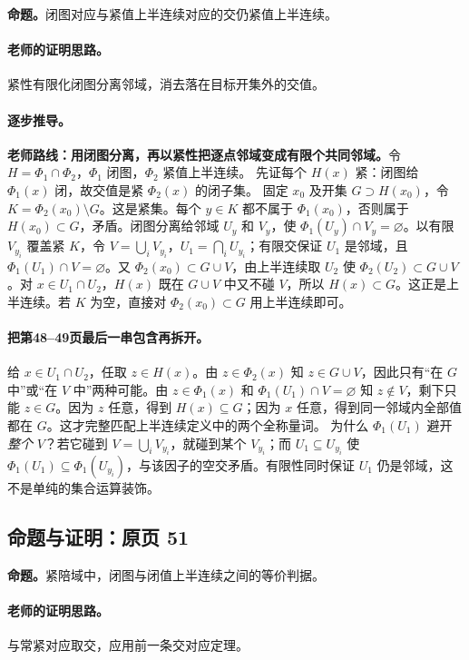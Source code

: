 \documentclass[11pt,a4paper]{article}
\theoremstyle{definition}\newtheorem{definition}{定义}\newtheorem{example}{例}
\begin{document}
\textbf{命题。}闭图对应与紧值上半连续对应的交仍紧值上半连续。

\paragraph{老师的证明思路。}紧性有限化闭图分离邻域，消去落在目标开集外的交值。

\paragraph{逐步推导。}\textbf{老师路线：用闭图分离，再以紧性把逐点邻域变成有限个共同邻域。}令 $H=\Phi_1\cap\Phi_2$，$\Phi_1$ 闭图，$\Phi_2$ 紧值上半连续。
先证每个 $H(x)$ 紧：闭图给 $\Phi_1(x)$ 闭，故交值是紧 $\Phi_2(x)$ 的闭子集。
固定 $x_0$ 及开集 $G\supset H(x_0)$，令 $K=\Phi_2(x_0)\setminus G$。这是紧集。每个 $y\in K$ 都不属于 $\Phi_1(x_0)$，否则属于 $H(x_0)\subset G$，矛盾。闭图分离给邻域 $U_y$ 和 $V_y$，使 $\Phi_1(U_y)\cap V_y=\varnothing$。以有限 $V_{y_i}$ 覆盖紧 $K$，令 $V=\bigcup_i V_{y_i}$，$U_1=\bigcap_iU_{y_i}$；有限交保证 $U_1$ 是邻域，且 $\Phi_1(U_1)\cap V=\varnothing$。又 $\Phi_2(x_0)\subset G\cup V$，由上半连续取 $U_2$ 使 $\Phi_2(U_2)\subset G\cup V$。对 $x\in U_1\cap U_2$，$H(x)$ 既在 $G\cup V$ 中又不碰 $V$，所以 $H(x)\subset G$。这正是上半连续。若 $K$ 为空，直接对 $\Phi_2(x_0)\subset G$ 用上半连续即可。


\paragraph{把第48--49页最后一串包含再拆开。}
给 $x\in U_1\cap U_2$，任取 $z\in H(x)$。由 $z\in\Phi_2(x)$ 知 $z\in G\cup V$，因此只有“在 $G$ 中”或“在 $V$ 中”两种可能。由 $z\in\Phi_1(x)$ 和 $\Phi_1(U_1)\cap V=\varnothing$ 知 $z\notin V$，剩下只能 $z\in G$。因为 $z$ 任意，得到 $H(x)\subseteq G$；因为 $x$ 任意，得到同一邻域内全部值都在 $G$。这才完整匹配上半连续定义中的两个全称量词。
为什么 $\Phi_1(U_1)$ 避开\emph{整个} $V$？若它碰到 $V=\bigcup_i V_{y_i}$，就碰到某个 $V_{y_i}$；而 $U_1\subseteq U_{y_i}$ 使 $\Phi_1(U_1)\subseteq\Phi_1(U_{y_i})$，与该因子的空交矛盾。有限性同时保证 $U_1$ 仍是邻域，这不是单纯的集合运算装饰。


\subsection{命题与证明：原页 51}

\textbf{命题。}紧陪域中，闭图与闭值上半连续之间的等价判据。

\paragraph{老师的证明思路。}与常紧对应取交，应用前一条交对应定理。
\end{document}
